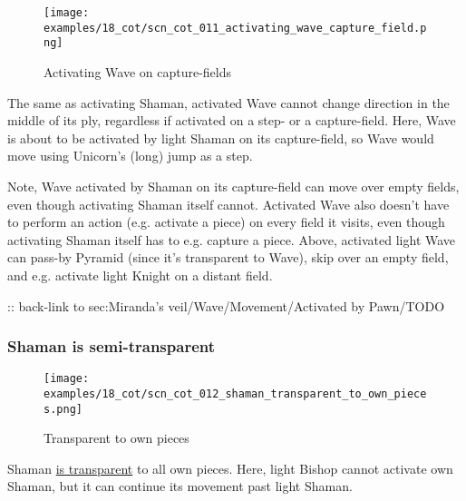 \noindent
\begin{wrapfigure}[13]{l}{0.4\textwidth}
\centering
\texttt{[image: examples/18\_cot/scn\_cot\_011\_activating\_wave\_capture\_field.png]}
\vspace*{-1.4\baselineskip}
\caption{Activating Wave on capture-fields}
\label{fig:scn_cot_011_activating_wave_capture_field}
\end{wrapfigure}
The same as activating Shaman, activated Wave cannot change direction in the middle
of its ply, regardless if activated on a step- or a capture-field. \newline
\indent
Here, Wave is about to be activated by light Shaman on its capture-field, so Wave
would move using Unicorn's (long) jump as a step.

Note, Wave activated by Shaman on its capture-field can move over empty fields,
even though activating Shaman itself cannot. Activated Wave also doesn't have to
perform an action (e.g. activate a piece) on every field it visits, even though
activating Shaman itself has to e.g. capture a piece. \newline
\indent
Above, activated light Wave can pass-by Pyramid (since it's transparent to Wave),
skip over an empty field, and e.g. activate light Knight on a distant field.

\clearpage %

\TODO :: back-link to sec:Miranda's veil/Wave/Movement/Activated by Pawn/TODO

\clearpage %

\subsubsection*{Shaman is semi-transparent}
\label{sec:Conquest of Tlalocan/Shaman/Movement/Shaman is semi-transparent}

\vspace*{-0.7\baselineskip}
\noindent
\begin{wrapfigure}[6]{l}{0.4\textwidth}
\centering
\texttt{[image: examples/18\_cot/scn\_cot\_012\_shaman\_transparent\_to\_own\_pieces.png]}
\vspace*{-1.4\baselineskip}
\caption{Transparent to own pieces}
\label{fig:scn_cot_012_shaman_transparent_to_own_pieces}
\end{wrapfigure}
Shaman \hyperref[fig:scn_mv_07_wave_is_transparent]{is transparent} to all own pieces. \newline
\indent
Here, light Bishop cannot activate own Shaman, but it can continue its movement
past light Shaman.

